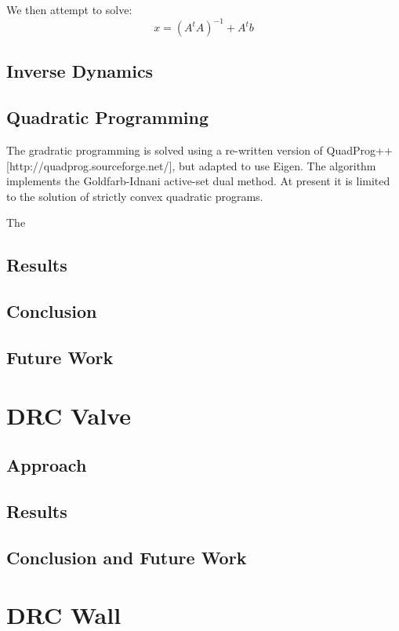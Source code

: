 \documentclass{article}
\begin{document}
We then attempt to solve: 
\begin{equation} 
x = (A^tA)^{-1} + A^tb

\end{equation}


\subsection{Inverse Dynamics}

\subsection{Quadratic Programming}

The gradratic programming is solved using a re-written version of QuadProg++[http://quadprog.sourceforge.net/], but adapted to use Eigen. The algorithm implements the Goldfarb-Idnani active-set dual method. At present it is limited to the solution of strictly convex quadratic programs. \cite{quadprog}

The 

\subsection{Results}

\subsection{Conclusion}

\subsection{Future Work}

\section{DRC Valve}
\subsection{Approach}
\subsection{Results}
\subsection{Conclusion and Future Work}

\section{DRC Wall}
\end{document}

